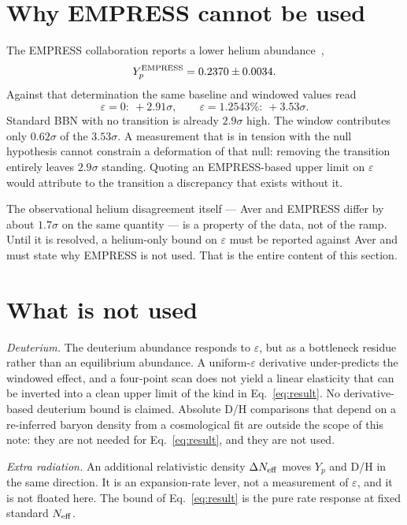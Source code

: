 \documentclass[aps,prd,twocolumn,superscriptaddress,nofootinbib,10pt]{revtex4-2}
\begin{document}
\section{Why EMPRESS cannot be used}\label{sec:empress}

The EMPRESS collaboration reports a lower helium abundance~\cite{EMPRESS2022},
%
\begin{equation}
  Y_p^{\rm EMPRESS} = 0.2370 \pm 0.0034.
  \label{eq:empress}
\end{equation}
%
Against that determination the same baseline and windowed values read
%
\begin{equation}
  \varepsilon=0:\ +2.91\sigma,
  \qquad
  \varepsilon=1.2543\%:\ +3.53\sigma.
  \label{eq:empress_pull}
\end{equation}
%
Standard BBN with no transition is already $2.9\sigma$ high. The window contributes only
$0.62\sigma$ of the $3.53\sigma$. A measurement that is in tension with the null hypothesis
cannot constrain a deformation of that null: removing the transition entirely leaves $2.9\sigma$
standing. Quoting an EMPRESS-based upper limit on $\varepsilon$ would attribute to the transition
a discrepancy that exists without it.

The observational helium disagreement itself --- Aver and EMPRESS differ by about $1.7\sigma$ on
the same quantity --- is a property of the data, not of the ramp. Until it is resolved, a
helium-only bound on $\varepsilon$ must be reported against Aver and must state why EMPRESS is
not used. That is the entire content of this section.

\section{What is not used}\label{sec:notused}

\emph{Deuterium.} The deuterium abundance responds to $\varepsilon$, but as a bottleneck residue
rather than an equilibrium abundance. A uniform-$\varepsilon$ derivative under-predicts the
windowed effect, and a four-point scan does not yield a linear elasticity that can be inverted
into a clean upper limit of the kind in Eq.~\eqref{eq:result}. No derivative-based deuterium bound
is claimed. Absolute D/H comparisons that depend on a re-inferred baryon density from a
cosmological fit are outside the scope of this note: they are not needed for
Eq.~\eqref{eq:result}, and they are not used.

\emph{Extra radiation.} An additional relativistic density $\Delta N_{\rm eff}$ moves $Y_p$ and
D/H in the same direction. It is an expansion-rate lever, not a measurement of $\varepsilon$, and
it is not floated here. The bound of Eq.~\eqref{eq:result} is the pure rate response at fixed
standard $N_{\rm eff}$.
\end{document}

